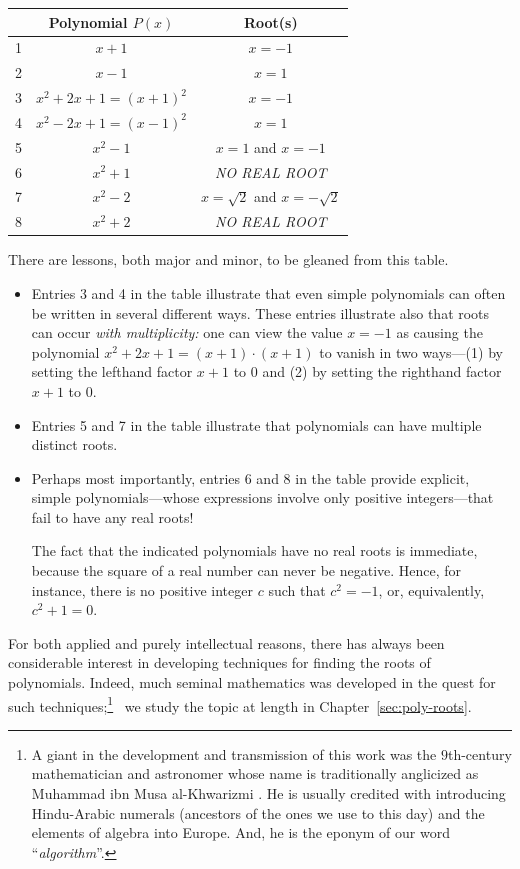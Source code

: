 \smallskip

\begin{tabular}{|c|c|c|}
\hline
 & Polynomial $P(x)$ & Root(s) \\
\hline
1 &
$x+1$  &  $x= -1$ \\
2 &
$x-1$  &  $x= 1$ \\
3 &
$x^2 + 2x +1 = (x+1)^2$ & $x = -1$ \\ 
4 &
$x^2 - 2x +1 = (x-1)^2$ & $x = 1$ \\ 
5 &
$x^2 - 1$ & $x = 1$ and $x= -1$ \\
6 &
$x^2 + 1$ & {\em NO REAL ROOT} \\
7 &
$x^2 -2$  & $x = \sqrt{2}$ and $x = - \sqrt{2}$ \\
8 &
$x^2 + 2$ & {\em NO REAL ROOT} \\
\hline
\end{tabular}

\smallskip

\noindent
There are lessons, both major and minor, to be gleaned from this
table.

\begin{itemize}
\item
Entries 3 and 4 in the table illustrate that even simple polynomials
can often be written in several different ways.  These entries
illustrate also that roots can occur {\em with multiplicity:}
 one can view the value $x = -1$
as causing the polynomial $x^2 + 2x +1 = (x+1)\cdot (x+1)$ to vanish
in two ways---(1) by setting the lefthand factor $x+1$ to $0$ and
(2) by setting the righthand factor $x+1$ to $0$.

\item
Entries 5 and 7 in the table illustrate that polynomials can have
multiple distinct roots.

\item
Perhaps most importantly, entries 6 and 8 in the table provide
explicit, simple polynomials---whose expressions involve only positive
integers---that fail to have any real roots!

The fact that the indicated polynomials have no real roots is
immediate, because the square of a real number can never be negative.
Hence, for instance, there is no positive integer $c$ such that $c^2 =
-1$, or, equivalently, $c^2 + 1 = 0$.
\end{itemize}

\smallskip

For both applied and purely intellectual reasons, there has always
been considerable interest in developing techniques for finding the
roots of polynomials.  Indeed, much seminal mathematics was developed
in the quest for such techniques;\footnote{A giant in the development
  and transmission of this work was the $9$th-century mathematician
  and astronomer whose name is traditionally anglicized as Muhammad
  ibn Musa al-Khwarizmi .  He is usually
  credited with introducing Hindu-Arabic numerals (ancestors of the
  ones we use to this day) and the elements of algebra into Europe.
  And, he is the eponym of our word ``{\em algorithm}''.}~ we study
the topic at length in Chapter~\ref{sec:poly-roots}.


